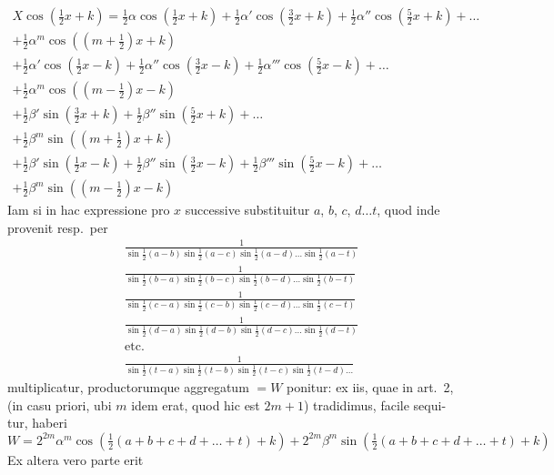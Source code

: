 \documentclass[12pt,a4paper]{article}
\begin{document}
\begin{multline*}
X\cos(\tfrac{1}{2}x+k) =
\tfrac{1}{2}\alpha\cos(\tfrac{1}{2}x+k) + \tfrac{1}{2}\alpha'\cos(\tfrac{3}{2}x+k) + \tfrac{1}{2}\alpha''\cos(\tfrac{5}{2}x+k) + \dots\\
+ \tfrac{1}{2}\alpha^m\cos((m+\tfrac{1}{2})x+k)\\
+ \tfrac{1}{2}\alpha'\cos(\tfrac{1}{2}x-k) + \tfrac{1}{2}\alpha''\cos(\tfrac{3}{2}x-k) + \tfrac{1}{2}\alpha'''\cos(\tfrac{5}{2}x-k) + \dots\\
+ \tfrac{1}{2}\alpha^m\cos((m-\tfrac{1}{2})x-k)\\
+ \tfrac{1}{2}\beta'\sin(\tfrac{3}{2}x+k) + \tfrac{1}{2}\beta''\sin(\tfrac{5}{2}x+k) + \dots\\
+ \tfrac{1}{2}\beta^m\sin((m+\tfrac{1}{2})x+k)\\
+ \tfrac{1}{2}\beta'\sin(\tfrac{1}{2}x-k) + \tfrac{1}{2}\beta''\sin(\tfrac{3}{2}x-k) + \tfrac{1}{2}\beta'''\sin(\tfrac{5}{2}x-k) + \dots\\
+ \tfrac{1}{2}\beta^m\sin((m-\tfrac{1}{2})x-k)
\end{multline*}
Iam si in hac expressione pro $x$ successive substituitur $a$, $b$, $c$, $d\dots t$, quod
inde provenit resp.\ per
\begin{align*}
&\frac{1}{\sin\tfrac{1}{2}(a-b)\sin\tfrac{1}{2}(a-c)\sin\tfrac{1}{2}(a-d)\dots\sin\tfrac{1}{2}(a-t)}\\
&\frac{1}{\sin\tfrac{1}{2}(b-a)\sin\tfrac{1}{2}(b-c)\sin\tfrac{1}{2}(b-d)\dots\sin\tfrac{1}{2}(b-t)}\\
&\frac{1}{\sin\tfrac{1}{2}(c-a)\sin\tfrac{1}{2}(c-b)\sin\tfrac{1}{2}(c-d)\dots\sin\tfrac{1}{2}(c-t)}\\
&\frac{1}{\sin\tfrac{1}{2}(d-a)\sin\tfrac{1}{2}(d-b)\sin\tfrac{1}{2}(d-c)\dots\sin\tfrac{1}{2}(d-t)}\\
&\text{etc.}\\
&\frac{1}{\sin\tfrac{1}{2}(t-a)\sin\tfrac{1}{2}(t-b)\sin\tfrac{1}{2}(t-c)\sin\tfrac{1}{2}(t-d)\dots}
\end{align*}
multiplicatur, productorumque aggregatum $=W$ ponitur: ex iis, quae in art.\ 2,
(in casu priori, ubi $m$ idem erat, quod hic est $2m+1$) tradidimus, facile sequi-
tur, haberi
\begin{equation*}
W = 2^{2m}\alpha^m\cos(\tfrac{1}{2}(a+b+c+d+\dots+t)+k)
+ 2^{2m}\beta^m\sin(\tfrac{1}{2}(a+b+c+d+\dots+t)+k)
\end{equation*}
Ex altera vero parte erit
\end{document}
